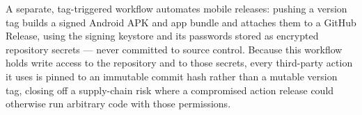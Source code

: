 A separate, tag-triggered workflow automates mobile releases: pushing a version tag builds a signed Android APK and app bundle and attaches them to a GitHub Release, using the signing keystore and its passwords stored as encrypted repository secrets --- never committed to source control. Because this workflow holds write access to the repository and to those secrets, every third-party action it uses is pinned to an immutable commit hash rather than a mutable version tag, closing off a supply-chain risk where a compromised action release could otherwise run arbitrary code with those permissions.
